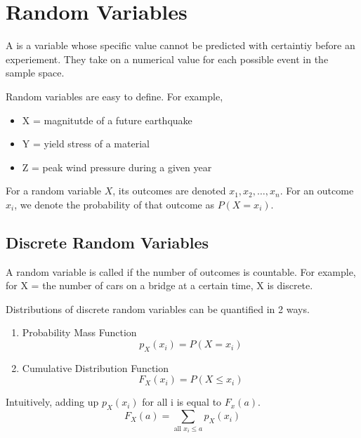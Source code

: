 \chapter{Random Variables}
A  is a variable whose specific value cannot be predicted with certaintiy before an experiement. They take on a numerical value for each possible event in the sample space.

\begin{example}
    Random variables are easy to define. For example,
    \begin{itemize}
        \item X = magnitutde of a future earthquake
        \item Y = yield stress of a material
        \item Z = peak wind pressure during a given year
    \end{itemize}
\end{example}

For a random variable $X$, its outcomes are denoted $x_1, x_2, \ldots, x_n$. For an outcome $x_i$, we denote the probability of that outcome as $P(X = x_i)$.

\section{Discrete Random Variables}
A random variable is called  if the number of outcomes is countable. For example, for X = the number of cars on a bridge at a certain time, X is discrete.

Distributions of discrete random variables can be quantified in 2 ways.
\begin{enumerate}
    \item Probability Mass Function
    \[
        p_X(x_i) = P(X = x_i)
    \]
    \begin{center}
    \end{center}

    \item Cumulative Distribution Function
    \[
        F_X(x_i) = P(X \le x_i)
    \]
    \begin{center}
    \end{center}
\end{enumerate}

Intuitively, adding up $p_X(x_i)$ for all i is equal to $F_x(a)$.
\[
    F_X(a) = \sum_{\text{all } x_i \le a} p_X(x_i)
\]

